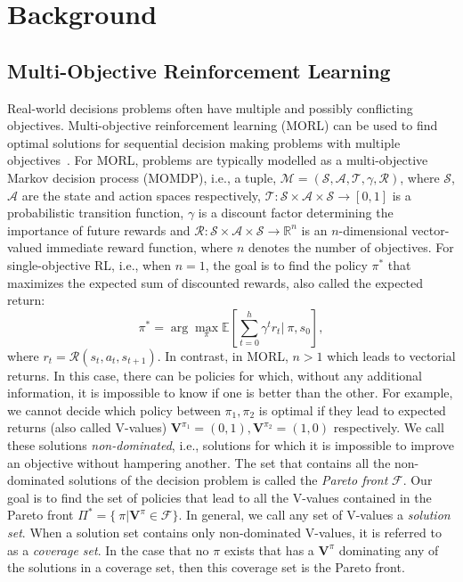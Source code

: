 \documentclass{article}
\renewcommand{\cite}[1]{\citep{#1}}
\newcommand{\mdpstatespace}{\mathcal{S}}
\newcommand{\mdpactionspace}{\mathcal{A}}
\newcommand{\mdpdiscount}{\gamma}
\newcommand{\mdppolicy}{\pi}
\newcommand{\momdpvaluefunction}{\mathbf{V}}
\newcommand{\mdptransition}{\mathcal{T}}
\newcommand{\mdprewardfn}{\mathcal{R}}
\newcommand{\momdprewardfn}{\bm{\mathcal{R}}}
\newcommand{\state}{s}
\newcommand{\action}{a}
\begin{document}
\section{Background}
\subsection{Multi-Objective Reinforcement Learning}
Real-world decisions problems often have multiple and possibly conflicting objectives. Multi-objective reinforcement learning (MORL) can be used to find optimal solutions for sequential decision making problems with multiple objectives~\cite{hayes2021practical}. For MORL, problems are typically modelled as a multi-objective Markov decision process (MOMDP), i.e., a tuple, $\mathcal{M} = (\mdpstatespace, \mdpactionspace, \mdptransition, \mdpdiscount, \momdprewardfn)$, where $\mdpstatespace$, $\mdpactionspace$ are the state and action spaces respectively, $\mdptransition \colon \mdpstatespace \times \mdpactionspace \times \mdpstatespace  \to \left[ 0, 1 \right]$ is a probabilistic transition function, $\mdpdiscount$ is a discount factor determining the importance of future rewards and $\momdprewardfn \colon \mdpstatespace \times \mdpactionspace \times \mdpstatespace \to \mathbb{R}^n$ is an $n$-dimensional vector-valued immediate reward function, where $n$ denotes the number of objectives. For single-objective RL, i.e., when $n = 1$, the goal is to find the policy $\mdppolicy^{*}$ that maximizes the expected sum of discounted rewards, also called the expected return:
\begin{equation}
\mdppolicy^*= \arg\max_\mdppolicy \mathbb{E} \left [ \sum_{t=0}^h \mdpdiscount^t r_t |\ \mdppolicy, s_0 \right ],
\end{equation}
where $r_t = \mdprewardfn(\state_t, \action_t, \state_{t+1})$.
In contrast, in MORL, $n > 1$ which leads to vectorial returns. In this case, there can be policies for which, without any additional information, it is impossible to know if one is better than the other. For example, we cannot decide which policy between $\mdppolicy_1, \mdppolicy_2$ is optimal if they lead to expected returns (also called V-values) $\momdpvaluefunction^{\mdppolicy_1}=(0,1), \momdpvaluefunction^{\mdppolicy_2}=(1,0)$ respectively. We call these solutions \emph{non-dominated}, i.e., solutions for which it is impossible to improve an objective without hampering another. The set that contains all the non-dominated solutions of the decision problem is called the \emph{Pareto front} $\mathcal{F}$. Our goal is to find the set of policies that lead to all the V-values contained in the Pareto front $\Pi^* = \{\ \pi | \momdpvaluefunction^{\pi} \in \mathcal{F}\}$. In general, we call any set of V-values a \emph{solution set}. When a solution set contains only  non-dominated V-values, it is referred to as a \emph{coverage set}. In the case that no $\mdppolicy$ exists that has a $\momdpvaluefunction^{\pi}$ dominating any of the solutions in a coverage set, then this coverage set is the Pareto front.
\end{document}
